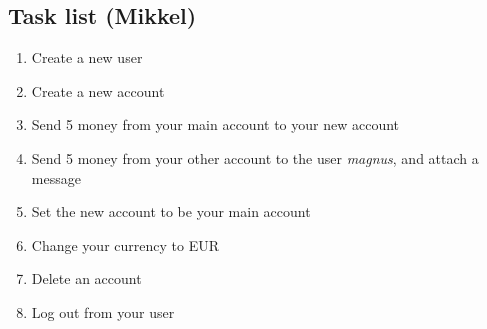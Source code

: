 \subsection{Task list (Mikkel)}
\label{tasklist}
\begin{enumerate}
    \item Create a new user
    \item Create a new account
    \item Send 5 money from your main account to your new account
    \item Send 5 money from your other account to the user \textit{magnus}, and attach a message
    \item Set the new account to be your main account
    \item Change your currency to EUR
    \item Delete an account 
    \item Log out from your user
\end{enumerate}
